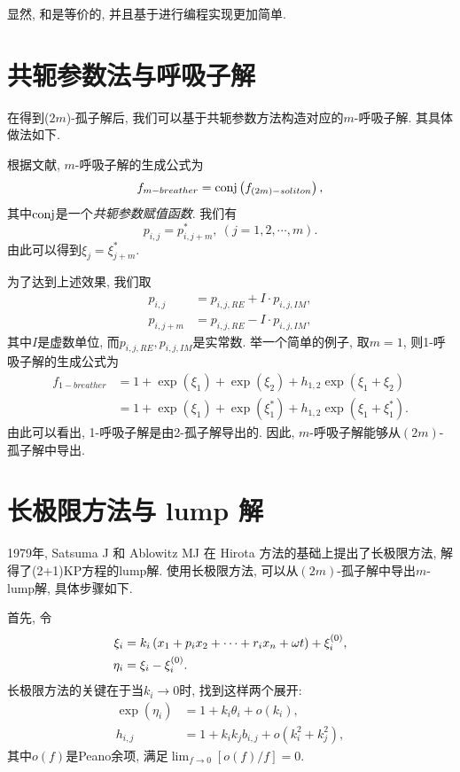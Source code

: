 显然, 和是等价的, 并且基于进行编程实现更加简单.

\section{共轭参数法与呼吸子解}
在得到($2m$)-孤子解后, 我们可以基于共轭参数方法构造对应的$m$-呼吸子解. 其具体做法如下.

根据文献\cite{tajiri1989breather}, $m$-呼吸子解的生成公式为
\begin{equation}
    f_{m-breather}={\rm conj}\left(f_{(2m)-soliton}\right), \label{f-breather}
\end{equation}
其中${\rm conj}$是一个\emph{共轭参数赋值函数}. 我们有 
\begin{equation}
    p_{i,j}=p_{i,j+m}^*,~(j=1,2,\cdots,m).
\end{equation}
由此可以得到$\xi_{j}=\xi_{j+m}^*$. 

为了达到上述效果, 我们取
\begin{equation}
\begin{split}
    p_{i,j}&=p_{i,j,RE}+I\cdot p_{i,j,IM}, \\ 
    p_{i,j+m}&=p_{i,j,RE}-I\cdot p_{i,j,IM},
\end{split}
\end{equation}
其中$I$是虚数单位, 而$p_{i,j,RE},p_{i,j,IM}$是实常数. 举一个简单的例子, 取$m=1$, 则1-呼吸子解的生成公式为
\begin{equation}
\begin{split}
f_{1-breather}&=1+\exp(\xi_1)+\exp(\xi_2)+h_{1,2}\exp(\xi_1+\xi_2) \\ 
&=1+\exp(\xi_1)+\exp(\xi_1^*)+h_{1,2}\exp(\xi_1+\xi_1^*).
\end{split}
\end{equation}
由此可以看出, 1-呼吸子解是由2-孤子解导出的. 因此, $m$-呼吸子解能够从$(2m)$-孤子解中导出.

\section{长极限方法与 lump 解}
1979年, Satsuma J 和 Ablowitz MJ \cite{satsuma1979two} 在 Hirota 方法的基础上提出了长极限方法, 解得了(2+1)KP\cite{kadomtsev1970stability}方程的lump解. 使用长极限方法, 可以从$(2m)$-孤子解中导出$m$-lump解, 具体步骤如下.

首先, 令
\begin{equation}
\begin{split}
    \xi_i&=k_i\left(x_1+p_ix_2+\cdots+r_ix_n+\omega t\right)+\xi_i^{(0)},\\
    \eta_i&=\xi_i-\xi_i^{(0)}.
\end{split}
\end{equation}
长极限方法的关键在于当$k_i\rightarrow 0$时, 找到这样两个展开:
\begin{equation}
\begin{split}
    \exp(\eta_i)&=1+k_i \theta_i+o(k_i), \\ 
    h_{i,j}&=1+k_ik_jb_{i,j}+o(k_i^2+k_j^2),
\end{split} \label{lump-expansion}
\end{equation}
其中$o(f)$是Peano余项, 满足$\lim_{f\rightarrow 0}[o(f)/f]=0$.

